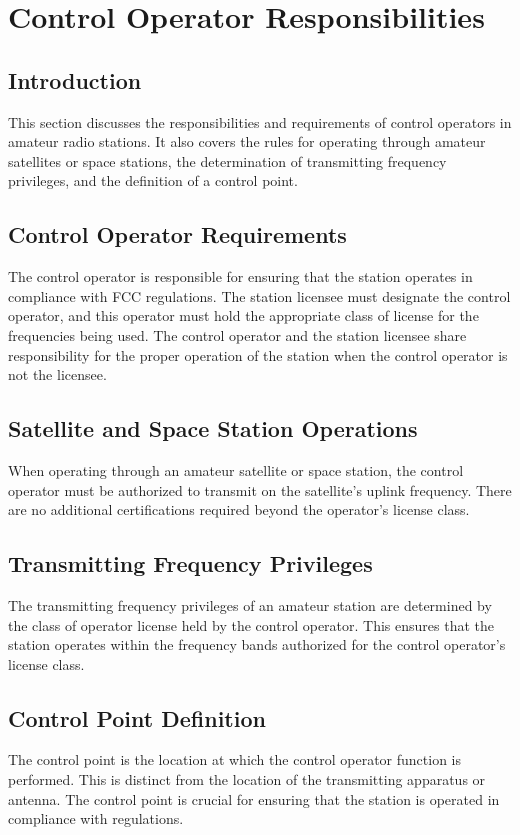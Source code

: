 \section{Control Operator Responsibilities}
\label{sec:control_operator}

\subsection*{Introduction}
This section discusses the responsibilities and requirements of control operators in amateur radio stations. It also covers the rules for operating through amateur satellites or space stations, the determination of transmitting frequency privileges, and the definition of a control point.

\subsection*{Control Operator Requirements}
The control operator is responsible for ensuring that the station operates in compliance with FCC regulations. The station licensee must designate the control operator, and this operator must hold the appropriate class of license for the frequencies being used. The control operator and the station licensee share responsibility for the proper operation of the station when the control operator is not the licensee.

\subsection*{Satellite and Space Station Operations}
When operating through an amateur satellite or space station, the control operator must be authorized to transmit on the satellite's uplink frequency. There are no additional certifications required beyond the operator's license class.

\subsection*{Transmitting Frequency Privileges}
The transmitting frequency privileges of an amateur station are determined by the class of operator license held by the control operator. This ensures that the station operates within the frequency bands authorized for the control operator's license class.

\subsection*{Control Point Definition}
The control point is the location at which the control operator function is performed. This is distinct from the location of the transmitting apparatus or antenna. The control point is crucial for ensuring that the station is operated in compliance with regulations.


